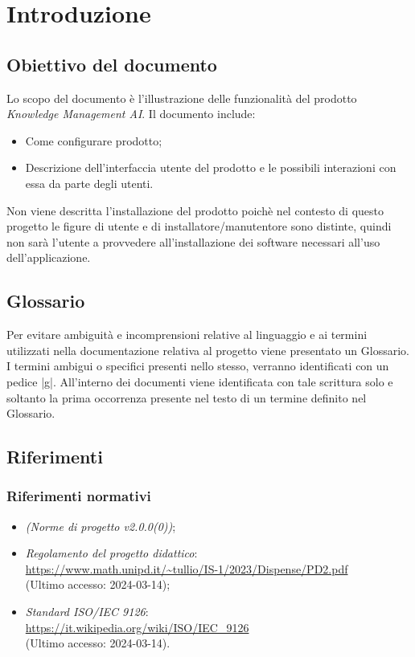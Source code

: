 \documentclass[10pt, a4paper]{article}
\title{\titolo}
\author{SWEetCode}
\begin{document}



\newpage

\tableofcontents
\newpage

\listoffigures
\newpage
\section{Introduzione}
\subsection{Obiettivo del documento}
Lo scopo del documento è l'illustrazione delle funzionalità del prodotto \textit{Knowledge Management AI}. Il documento include: 
\begin{itemize}
    \item Come configurare prodotto;
    \item Descrizione dell'interfaccia utente del prodotto e le possibili interazioni con essa da parte degli utenti.
\end{itemize} 
Non viene descritta l'installazione del prodotto poichè nel contesto di questo progetto le figure di utente e di installatore/manutentore sono distinte, quindi non sarà l'utente a provvedere all'installazione dei software necessari all'uso dell'applicazione.
\subsection{Glossario}
Per evitare ambiguità e incomprensioni relative al linguaggio e ai termini utilizzati nella documentazione relativa al progetto viene presentato un Glossario. I termini ambigui o specifici presenti nello stesso, verranno identificati con un pedice |g|. All’interno dei documenti viene identificata con tale scrittura solo e soltanto la prima occorrenza presente nel testo di un termine definito nel Glossario.

\subsection{Riferimenti}
\subsubsection{Riferimenti normativi}
\begin{itemize}
    \item \textit{(Norme di progetto v2.0.0(0))};
    \item \textit{Regolamento del progetto didattico}: \\
        \url{https://www.math.unipd.it/~tullio/IS-1/2023/Dispense/PD2.pdf}\\
        (Ultimo accesso: 2024-03-14);
    \item \textit{Standard ISO/IEC 9126}:\\
        \url{https://it.wikipedia.org/wiki/ISO/IEC_9126}\\
        (Ultimo accesso: 2024-03-14).
    \end{itemize}
\end{document}
